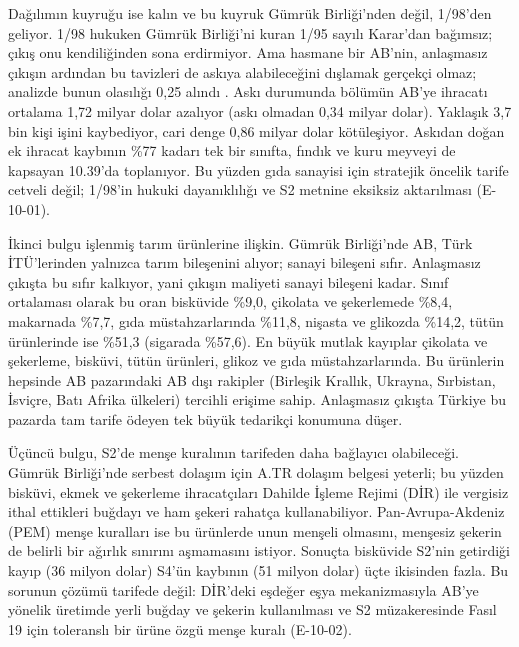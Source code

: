 Dağılımın kuyruğu ise kalın ve bu kuyruk Gümrük Birliği'nden değil, 1/98'den geliyor. 1/98 hukuken Gümrük Birliği'ni kuran 1/95 sayılı Karar'dan bağımsız; çıkış onu kendiliğinden sona erdirmiyor. Ama hasmane bir AB'nin, anlaşmasız çıkışın ardından bu tavizleri de askıya alabileceğini dışlamak gerçekçi olmaz; analizde bunun olasılığı 0,25 alındı \etiketH{}. Askı durumunda bölümün AB'ye ihracatı ortalama 1,72 milyar dolar azalıyor (askı olmadan 0,34 milyar dolar). Yaklaşık 3,7 bin kişi işini kaybediyor, cari denge 0,86 milyar dolar kötüleşiyor. Askıdan doğan ek ihracat kaybının \%77 kadarı tek bir sınıfta, fındık ve kuru meyveyi de kapsayan 10.39'da toplanıyor. Bu yüzden gıda sanayisi için stratejik öncelik tarife cetveli değil; 1/98'in hukuki dayanıklılığı ve S2 metnine eksiksiz aktarılması (E-10-01).

İkinci bulgu işlenmiş tarım ürünlerine ilişkin. Gümrük Birliği'nde AB, Türk İTÜ'lerinden yalnızca tarım bileşenini alıyor; sanayi bileşeni sıfır. Anlaşmasız çıkışta bu sıfır kalkıyor, yani çıkışın maliyeti sanayi bileşeni kadar. Sınıf ortalaması olarak bu oran bisküvide \%9,0, çikolata ve şekerlemede \%8,4, makarnada \%7,7, gıda müstahzarlarında \%11,8, nişasta ve glikozda \%14,2, tütün ürünlerinde ise \%51,3 (sigarada \%57,6). En büyük mutlak kayıplar çikolata ve şekerleme, bisküvi, tütün ürünleri, glikoz ve gıda müstahzarlarında. Bu ürünlerin hepsinde AB pazarındaki AB dışı rakipler (Birleşik Krallık, Ukrayna, Sırbistan, İsviçre, Batı Afrika ülkeleri) tercihli erişime sahip. Anlaşmasız çıkışta Türkiye bu pazarda tam tarife ödeyen tek büyük tedarikçi konumuna düşer.

Üçüncü bulgu, S2'de menşe kuralının tarifeden daha bağlayıcı olabileceği. Gümrük Birliği'nde serbest dolaşım için A.TR dolaşım belgesi yeterli; bu yüzden bisküvi, ekmek ve şekerleme ihracatçıları Dahilde İşleme Rejimi (DİR) ile vergisiz ithal ettikleri buğdayı ve ham şekeri rahatça kullanabiliyor. Pan-Avrupa-Akdeniz (PEM) menşe kuralları ise bu ürünlerde unun menşeli olmasını, menşesiz şekerin de belirli bir ağırlık sınırını aşmamasını istiyor. Sonuçta bisküvide S2'nin getirdiği kayıp (36 milyon dolar) S4'ün kaybının (51 milyon dolar) üçte ikisinden fazla. Bu sorunun çözümü tarifede değil: DİR'deki eşdeğer eşya mekanizmasıyla AB'ye yönelik üretimde yerli buğday ve şekerin kullanılması ve S2 müzakeresinde Fasıl 19 için toleranslı bir ürüne özgü menşe kuralı (E-10-02).

